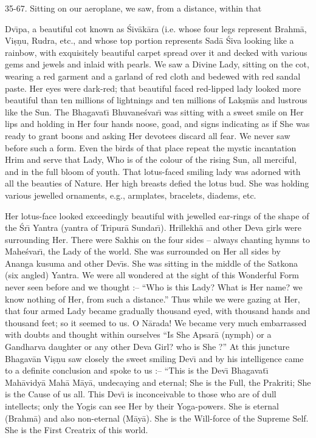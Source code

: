 35-67. Sitting on our aeroplane, we saw, from a distance, within that

Dv\={\i}pa, a beautiful cot known as \'Siv\=ak\=ara (i.e. whose four legs represent Brahm\=a, Vi\d{s}\d{n}u, Rudra, etc., and whose top portion represents Sad\=a \'Siva looking like a rainbow, with exquisitely beautiful carpet spread over it and decked with various gems and jewels and inlaid with pearls. We saw a Divine Lady, sitting on the cot, wearing a red garment and a garland of red cloth and bedewed with red sandal paste. Her eyes were dark-red; that beautiful faced red-lipped lady looked more beautiful than ten millions of lightnings and ten millions of Lak\d{s}m\={\i}s and lustrous like the Sun. The Bhagavat\={\i} Bhuvane\'svar\={\i} was sitting with a sweet smile on Her lips and holding in Her four hands noose, goad, and signs indicating as if She was ready to grant boons and asking Her devotees discard all fear. We never saw before such a form. Even the birds of that place repeat the mystic incantation Hrim and serve that Lady, Who is of the colour of the rising Sun, all merciful, and in the full bloom of youth. That lotus-faced smiling lady was adorned with all the beauties of Nature. Her high breasts defied the lotus bud. She was holding various jewelled ornaments, e.g., armplates, bracelets, diadems, etc.

Her lotus-face looked exceedingly beautiful with jewelled ear-rings of the shape of the \'Sr\={\i} Yantra (yantra of Tripur\=a Sundar\={\i}). Hrillekh\=a and other Deva girls were surrounding Her. There were Sakhis on the four sides -- always chanting hymns to Mahe\'svar\={\i}, the Lady of the world. She was surrounded on Her all sides by Ananga kusuma and other Dev\={\i}s. She was sitting in the middle of the Satkona (six angled) Yantra. We were all wondered at the sight of this Wonderful Form never seen before and we thought :-- ``Who is this Lady? What is Her name? we know nothing of Her, from such a distance.'' Thus while we were gazing at Her, that four armed Lady became gradually thousand eyed, with thousand hands and thousand feet; so it seemed to us. O N\=arada! We became very much embarrassed with doubts and thought within ourselves ``Is She Apsar\=a (nymph) or a Gandharva daughter or any other Deva Girl? who is She ?'' At this juncture Bhagav\=an Vi\d{s}\d{n}u saw closely the sweet smiling Dev\={\i} and by his intelligence came to a definite conclusion and spoke to us :-- ``This is the Dev\={\i} Bhagavat\={\i} Mah\=avidy\=a Mah\=a M\=ay\=a, undecaying and eternal; She is the Full, the Prakriti; She is the Cause of us all. This Dev\={\i} is inconceivable to those who are of dull intellects; only the Yogis can see Her by their Yoga-powers. She is eternal (Brahm\=a) and also non-eternal (M\=ay\=a). She is the Will-force of the Supreme Self. She is the First Creatrix of this world.


